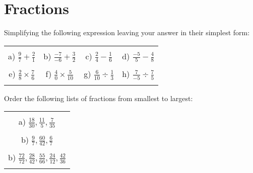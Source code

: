 \documentclass[12pt]{article}
\begin{document}
\section{Fractions}
Simplifying the following expression leaving your answer in their simplest form:
\begin{table}[h!]
\centering
\begin{tabular}{c c c c}
\hspace{4cm} & \hspace{4cm} & \hspace{4cm} & \hspace{4cm}\\
a) $\frac{{9}}{{7}} + \frac{{2}}{{1}}$ & b) $\frac{{-7}}{{-6}} + \frac{{3}}{{2}}$ & c) $\frac{{2}}{{4}} - \frac{{1}}{{6}}$ & d) $\frac{{-5}}{{5}} - \frac{{4}}{{8}}$ \\ \\
e) $\frac{{2}}{{8}}\times\frac{{7}}{{6}}$ & f) $\frac{{4}}{{0}}\times\frac{{5}}{{10}}$ & g) $\frac{{6}}{{10}}\div\frac{{1}}{{3}}$ & h) $\frac{{7}}{{-5}}\div\frac{{7}}{{5}}$ \\ \\
\end{tabular}
\end{table}
\newline
Order the following lists of fractions from smallest to largest:
\begin{table}[h!]
\centering
\begin{tabular}{c}
\hspace{4cm}\\
a) $\frac{18}{30}, \frac{11}{5}, \frac{7}{35}$\\ \\
b) $\frac{9}{7}, \frac{60}{42}, \frac{6}{7}$\\ \\
b) $\frac{72}{72}, \frac{28}{42}, \frac{55}{66}, \frac{24}{12}, \frac{42}{36}$\\ \\
\end{tabular}
\end{table}
\newline
\end{document}
